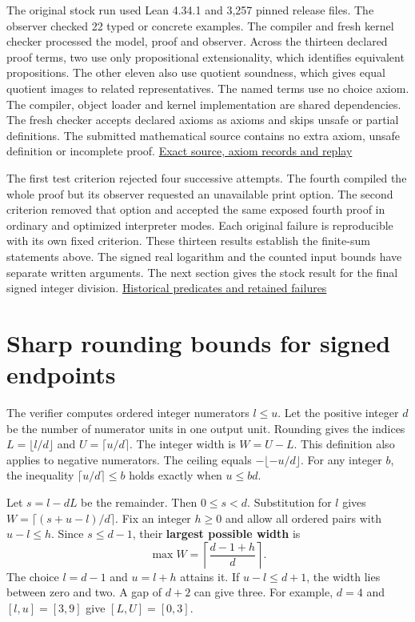 The original stock run used Lean 4.34.1 and 3,257 pinned release files. The observer checked 22 typed or concrete examples. The compiler and fresh kernel checker processed the model, proof and observer. Across the thirteen declared proof terms, two use only propositional extensionality, which identifies equivalent propositions. The other eleven also use quotient soundness, which gives equal quotient images to related representatives. The named terms use no choice axiom. The compiler, object loader and kernel implementation are shared dependencies. The fresh checker accepts declared axioms as axioms and skips unsafe or partial definitions. The submitted mathematical source contains no extra axiom, unsafe definition or incomplete proof. \href{https://github.com/sepahead/pid-rs/blob/main/audit/research/signed-log-certificate-enclosure/formal/README.md}{Exact source, axiom records and replay}

The first test criterion rejected four successive attempts. The fourth compiled the whole proof but its observer requested an unavailable print option. The second criterion removed that option and accepted the same exposed fourth proof in ordinary and optimized interpreter modes. Each original failure is reproducible with its own fixed criterion. These thirteen results establish the finite-sum statements above. The signed real logarithm and the counted input bounds have separate written arguments. The next section gives the stock result for the final signed integer division. \href{https://github.com/sepahead/pid-rs/blob/main/audit/research/signed-log-certificate-enclosure/formal/history/attempts.jsonl}{Historical predicates and retained failures}

\clearpage

\section{Sharp rounding bounds for signed endpoints}\label{sharp-rounding-bounds-for-signed-endpoints}

The verifier computes ordered integer numerators \(l\le u\). Let the positive integer \(d\) be the number of numerator units in one output unit. Rounding gives the indices \(L=\lfloor l/d\rfloor\) and \(U=\lceil u/d\rceil\). The integer width is \(W=U-L\). This definition also applies to negative numerators. The ceiling equals \(-\lfloor-u/d\rfloor\). For any integer \(b\), the inequality \(\lceil u/d\rceil\le b\) holds exactly when \(u\le bd\).

Let \(s=l-dL\) be the remainder. Then \(0\le s<d\). Substitution for \(l\) gives \(W=\lceil(s+u-l)/d\rceil\). Fix an integer \(h\ge0\) and allow all ordered pairs with \(u-l\le h\). Since \(s\le d-1\), their \textbf{largest possible width} is \[
 \max W=\left\lceil\frac{d-1+h}{d}\right\rceil .
\] The choice \(l=d-1\) and \(u=l+h\) attains it. If \(u-l\le d+1\), the width lies between zero and two. A gap of \(d+2\) can give three. For example, \(d=4\) and \([l,u]=[3,9]\) give \([L,U]=[0,3]\).

